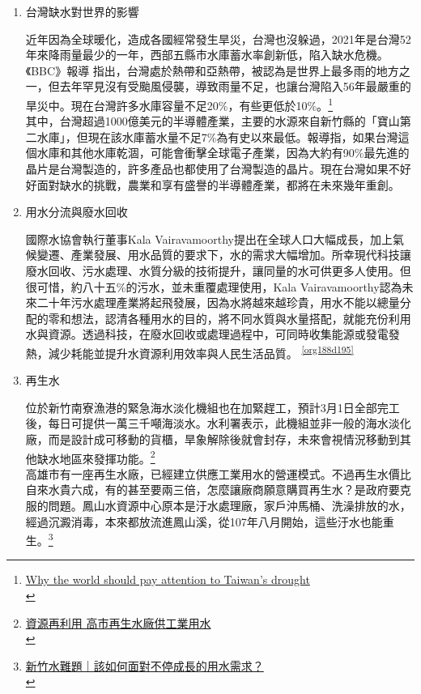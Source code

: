 \documentclass[a4paper,12pt]{article}
\begin{document}
\begin{enumerate}
\item 台灣缺水對世界的影響
\label{sec:orgc4e8399}

近年因為全球暖化，造成各國經常發生旱災，台灣也沒躲過，2021年是台灣52年來降雨量最少的一年，西部五縣市水庫蓄水率創新低，陷入缺水危機。《BBC》報導 指出，台灣處於熱帶和亞熱帶，被認為是世界上最多雨的地方之一，但去年罕見沒有受颱風侵襲，導致雨量不足，也讓台灣陷入56年最嚴重的旱災中。現在台灣許多水庫容量不足20\%，有些更低於10\%。\footnote{\href{https://www.bbc.com/news/world-asia-56798308}{Why the world should pay attention to Taiwan's drought}\\}\\

其中，台灣超過1000億美元的半導體產業，主要的水源來自新竹縣的「寶山第二水庫」，但現在該水庫蓄水量不足7\%為有史以來最低。報導指，如果台灣這個水庫和其他水庫乾涸，可能會衝擊全球電子產業，因為大約有90\%最先進的晶片是台灣製造的，許多產品也都使用了台灣製造的晶片。現在台灣如果不好好面對缺水的挑戰，農業和享有盛譽的半導體產業，都將在未來幾年重創。\\

\item 用水分流與廢水回收
\label{sec:org0522dda}

國際水協會執行董事Kala Vairavamoorthy提出在全球人口大幅成長，加上氣候變遷、產業發展、用水品質的要求下，水的需求大幅增加。所幸現代科技讓廢水回收、污水處理、水質分級的技術提升，讓同量的水可供更多人使用。但很可惜，約八十五\%的污水，並未重覆處理使用，Kala Vairavamoorthy認為未來二十年污水處理產業將起飛發展，因為水將越來越珍貴，用水不能以總量分配的零和想法，認清各種用水的目的，將不同水質與水量搭配，就能充份利用水與資源。透過科技，在廢水回收或處理過程中，可同時收集能源或發電發熱，減少耗能並提升水資源利用效率與人民生活品質。 \textsuperscript{\ref{org188d195}}\\

\item 再生水
\label{sec:org2274cee}

位於新竹南寮漁港的緊急海水淡化機組也在加緊趕工，預計3月1日全部完工後，每日可提供一萬三千噸海淡水。水利署表示，此機組並非一般的海水淡化廠，而是設計成可移動的貨櫃，旱象解除後就會封存，未來會視情況移動到其他缺水地區來發揮功能。\footnote{\href{https://news.pts.org.tw/article/505049}{資源再利用 高市再生水廠供工業用水}\\\label{org5f7e674}}\\

高雄市有一座再生水廠，已經建立供應工業用水的營運模式。不過再生水價比自來水貴六成，有的甚至要兩三倍，怎麼讓廠商願意購買再生水？是政府要克服的問題。鳳山水資源中心原本是汙水處理廠，家戶沖馬桶、洗澡排放的水，經過沉澱消毒，本來都放流進鳳山溪，從107年八月開始，這些汙水也能重生。\footnote{\href{https://ourisland.pts.org.tw/content/7429}{新竹水難題｜該如何面對不停成長的用水需求？}\\}\\


\end{enumerate}
\end{document}
